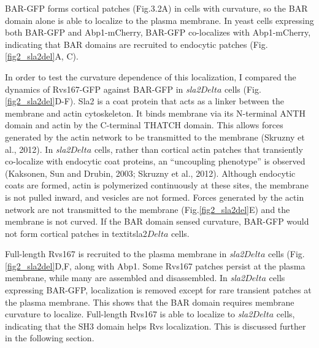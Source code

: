 	\vspace{5mm}
BAR-GFP forms cortical patches (Fig.3.2A) in cells with curvature, so the BAR domain alone is able to localize to the plasma membrane. In yeast cells expressing both BAR-GFP and Abp1-mCherry, BAR-GFP co-localizes with Abp1-mCherry, indicating that BAR domains are recruited to endocytic patches  (Fig.\ref{fig2_sla2del}A, C).  



	\vspace{5mm}
In order to test the curvature dependence of this localization, I compared the dynamics of Rvs167-GFP against BAR-GFP in \textit{sla2$Delta$} cells (Fig.\ref{fig2_sla2del}D-F). Sla2 is a coat protein that acts as a linker between the membrane and actin cytoskeleton. It binds membrane via its N-terminal ANTH domain and actin by the C-terminal THATCH domain. This allows forces generated by the actin network to be transmitted to the membrane (Skruzny et al., 2012). In \textit{sla2$Delta$} cells, rather than cortical actin patches that transiently co-localize with endocytic coat proteins, an “uncoupling phenotype” is observed (Kaksonen, Sun and Drubin, 2003; Skruzny et al., 2012). Although endocytic coats are formed, actin is polymerized continuously at these sites, the membrane is not pulled inward, and vesicles are not formed. Forces generated by the actin network are not transmitted to the membrane (Fig.\ref{fig2_sla2del}E) and the membrane is not curved. If the BAR domain sensed curvature, BAR-GFP would not form cortical patches in textit{sla2$Delta$} cells.



Full-length Rvs167 is recruited to the plasma membrane in \textit{sla2$Delta$} cells  (Fig.\ref{fig2_sla2del}D,F, along with Abp1. Some Rvs167 patches persist at the plasma membrane, while many are assembled and disassembled. In \textit{sla2$Delta$} cells expressing BAR-GFP, localization is removed except for rare transient patches at the plasma membrane. This shows that the BAR domain requires membrane curvature to localize. Full-length Rvs167 is able to localize to \textit{sla2$Delta$} cells, indicating that the SH3 domain helps Rvs localization. This is discussed further in the following section. 






